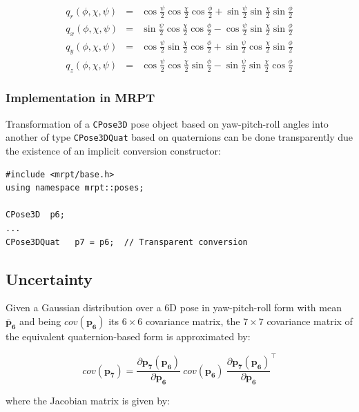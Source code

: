 \documentclass[a4paper,11pt]{report}
\begin{document}
\begin{eqnarray}
  q_r(\phi,\chi,\psi) &=& \cos\frac{\psi}{2} \cos\frac{\chi}{2}  \cos\frac{\phi}{2}  + 
  \sin\frac{\psi}{2} \sin\frac{\chi}{2} \sin\frac{\phi}{2}    \\
  q_x(\phi,\chi,\psi) &=& \sin\frac{\psi}{2} \cos\frac{\chi}{2}  \cos\frac{\phi}{2}  - 
  \cos\frac{\psi}{2} \sin\frac{\chi}{2} \sin\frac{\phi}{2}    \\
  q_y(\phi,\chi,\psi) &=& \cos\frac{\psi}{2} \sin\frac{\chi}{2}  \cos\frac{\phi}{2}  + 
  \sin\frac{\psi}{2} \cos\frac{\chi}{2} \sin\frac{\phi}{2}    \\
  q_z(\phi,\chi,\psi) &=& \cos\frac{\psi}{2} \cos\frac{\chi}{2}  \sin\frac{\phi}{2}  -
  \sin\frac{\psi}{2} \sin\frac{\chi}{2} \cos\frac{\phi}{2}   
\end{eqnarray}


\subsubsection{Implementation in MRPT}

Transformation of a \texttt{CPose3D} pose object based on yaw-pitch-roll angles 
into another of type \texttt{CPose3DQuat} based on quaternions can be done transparently 
due the existence of an implicit conversion constructor:

\begin{lstlisting}
#include <mrpt/base.h> 
using namespace mrpt::poses; 

CPose3D  p6;
...
CPose3DQuat   p7 = p6;  // Transparent conversion
\end{lstlisting}


\subsection{Uncertainty}

Given a Gaussian distribution over a 6D pose in yaw-pitch-roll form with 
mean ${\mathbf{\bar{p}_6}}$ and being  $cov(\mathbf{p_6})$ its $6 \times 6$ covariance matrix, 
the $7 \times 7$ covariance matrix of the equivalent quaternion-based form 
is approximated by:

\begin{equation}
cov(\mathbf{p_7}) =
\frac{\partial \mathbf{p_7}(\mathbf{p_6}) }{\partial \mathbf{p_6}} ~ 
cov(\mathbf{p_6})  ~
\frac{\partial \mathbf{p_7}(\mathbf{p_6}) }{\partial \mathbf{p_6}}^\top 
\end{equation}

\noindent where the Jacobian matrix is given by:
\end{document}
